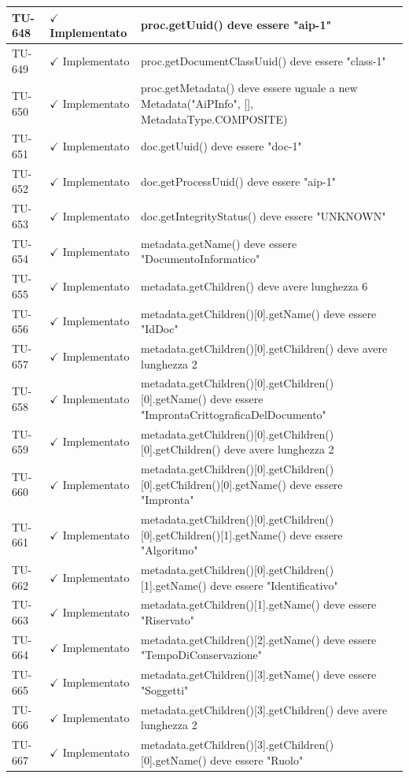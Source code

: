 ﻿\documentclass[a4paper,12pt]{article}
\newcommand{\ok}{\textcolor{green!60!black}{$\checkmark$ Implementato}}
\begin{document}
\begin{longtable}{|p{2cm}|p{3.5cm}|p{9.5cm}|}
\hline
TU-648 & \ok & proc.getUuid() deve essere "aip-1" \\
\hline
TU-649 & \ok & proc.getDocumentClassUuid() deve essere "class-1" \\
\hline
TU-650 & \ok & proc.getMetadata() deve essere uguale a new Metadata("AiPInfo", [], MetadataType.COMPOSITE) \\
\hline
TU-651 & \ok & doc.getUuid() deve essere "doc-1" \\
\hline
TU-652 & \ok & doc.getProcessUuid() deve essere "aip-1" \\
\hline
TU-653 & \ok & doc.getIntegrityStatus() deve essere "UNKNOWN" \\
\hline
TU-654 & \ok & metadata.getName() deve essere "DocumentoInformatico" \\
\hline
TU-655 & \ok & metadata.getChildren() deve avere lunghezza 6 \\
\hline
TU-656 & \ok & metadata.getChildren()[0].getName() deve essere "IdDoc" \\
\hline
TU-657 & \ok & metadata.getChildren()[0].getChildren() deve avere lunghezza 2 \\
\hline
TU-658 & \ok & metadata.getChildren()[0].getChildren()[0].getName() deve essere "ImprontaCrittograficaDelDocumento" \\
\hline
TU-659 & \ok & metadata.getChildren()[0].getChildren()[0].getChildren() deve avere lunghezza 2 \\
\hline
TU-660 & \ok & metadata.getChildren()[0].getChildren()[0].getChildren()[0].getName() deve essere "Impronta" \\
\hline
TU-661 & \ok & metadata.getChildren()[0].getChildren()[0].getChildren()[1].getName() deve essere "Algoritmo" \\
\hline
TU-662 & \ok & metadata.getChildren()[0].getChildren()[1].getName() deve essere "Identificativo" \\
\hline
TU-663 & \ok & metadata.getChildren()[1].getName() deve essere "Riservato" \\
\hline
TU-664 & \ok & metadata.getChildren()[2].getName() deve essere "TempoDiConservazione" \\
\hline
TU-665 & \ok & metadata.getChildren()[3].getName() deve essere "Soggetti" \\
\hline
TU-666 & \ok & metadata.getChildren()[3].getChildren() deve avere lunghezza 2 \\
\hline
TU-667 & \ok & metadata.getChildren()[3].getChildren()[0].getName() deve essere "Ruolo" \\
\hline

\end{longtable}
\end{document}
